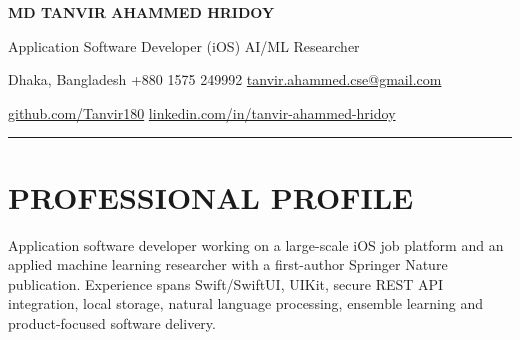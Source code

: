 \documentclass[a4paper,10pt]{article}
\begin{document}
{\fontsize{24}{28}\selectfont\bfseries\color{navy} MD TANVIR AHAMMED HRIDOY}\par
{\color{green}\large Application Software Developer (iOS) \textbar{} AI/ML Researcher}\par
\vspace{2pt}
{\small Dhaka, Bangladesh \quad \textbar{} \quad +880 1575 249992 \quad \textbar{} \quad \href{mailto:tanvir.ahammed.cse@gmail.com}{tanvir.ahammed.cse@gmail.com}}\par
{\small \href{https://github.com/Tanvir180}{github.com/Tanvir180} \quad \textbar{} \quad \href{https://www.linkedin.com/in/tanvir-ahammed-hridoy/}{linkedin.com/in/tanvir-ahammed-hridoy}}\par
\vspace{7pt}
{\color{green}\rule{\linewidth}{2pt}}

\section{PROFESSIONAL PROFILE}
\small
Application software developer working on a large-scale iOS job platform and an applied machine learning researcher with a first-author Springer Nature publication. Experience spans Swift/SwiftUI, UIKit, secure REST API integration, local storage, natural language processing, ensemble learning and product-focused software delivery.
\end{document}
